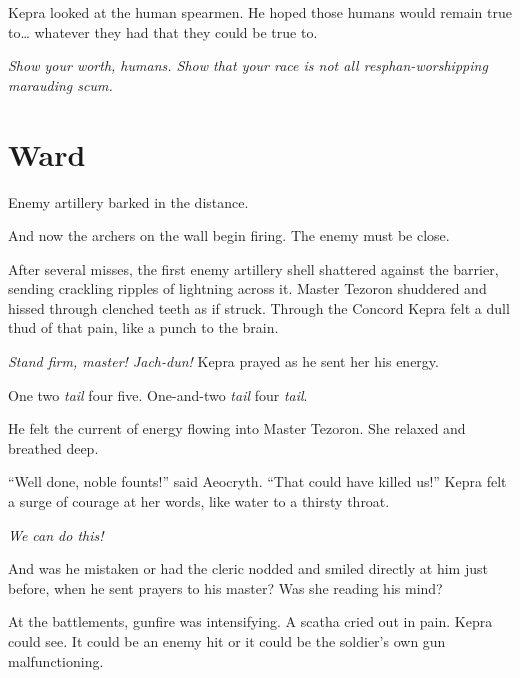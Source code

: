 \documentclass
  [a4paper,
   12pt,
   oneside
  ]%
  {article}
\newcommand{\drum}[1]{\textsf{#1}}
\begin{document}

Kepra looked at the human spearmen. He hoped those humans would remain true to… whatever they had that they could be true to. 

\emph{Show your worth, humans. Show that your race is not all resphan-worshipping marauding scum.}



\section{Ward}
Enemy artillery barked in the distance.

And now the archers on the wall begin firing. The enemy must be close.

After several misses, the first enemy artillery shell shattered against the barrier, sending crackling ripples of lightning across it. Master Tezoron shuddered and hissed through clenched teeth as if struck. Through the Concord Kepra felt a dull thud of that pain, like a punch to the brain. 

\emph{Stand firm, master! Jach-dun!} Kepra prayed as he sent her his energy.

\drum{One two \emph{tail} four five. One-and-two \emph{tail} four \emph{tail}.}

He felt the current of energy flowing into Master Tezoron. She relaxed and breathed deep.

``Well done, noble founts!'' said Aeocryth. ``That could have killed us!'' 
Kepra felt a surge of courage at her words, like water to a thirsty throat. 

\emph{We can do this!}

And was he mistaken or had the cleric nodded and smiled directly at him just before, when he sent prayers to his master? 
Was she reading his mind?

At the battlements, gunfire was intensifying. A scatha cried out in pain. Kepra could see. It could be an enemy hit or it could be the soldier’s own gun malfunctioning.
\end{document}

